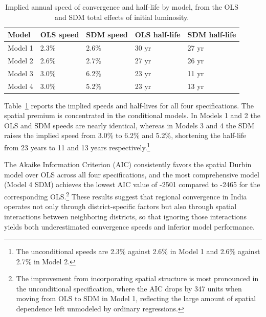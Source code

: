 \documentclass[
  a4paper, 
  twoside,
  final
]{article}
\begin{document}
\begin{longtable}[]{@{}lllll@{}}

\caption{\label{tbl-speed}Implied annual speed of convergence and
half-life by model, from the OLS and SDM total effects of initial
luminosity.}

\tabularnewline

\toprule\noalign{}
Model & OLS speed & SDM speed & OLS half-life & SDM half-life \\
\midrule\noalign{}
\endhead
\bottomrule\noalign{}
\endlastfoot
Model 1 & 2.3\% & 2.6\% & 30 yr & 27 yr \\
Model 2 & 2.6\% & 2.7\% & 27 yr & 26 yr \\
Model 3 & 3.0\% & 6.2\% & 23 yr & 11 yr \\
Model 4 & 3.0\% & 5.2\% & 23 yr & 13 yr \\

\end{longtable}

Table~\ref{tbl-speed} reports the implied speeds and half-lives for all
four specifications. The spatial premium is concentrated in the
conditional models. In Models 1 and 2 the OLS and SDM speeds are nearly
identical, whereas in Models 3 and 4 the SDM raises the implied speed
from 3.0\% to 6.2\% and 5.2\%, shortening the half-life from 23 years to
11 and 13 years respectively.\footnote{The unconditional speeds are
  2.3\% against 2.6\% in Model 1 and 2.6\% against 2.7\% in Model 2.}

The Akaike Information Criterion (AIC) consistently favors the spatial
Durbin model over OLS across all four specifications, and the most
comprehensive model (Model 4 SDM) achieves the lowest AIC value of -2501
compared to -2465 for the corresponding OLS.\footnote{The improvement
  from incorporating spatial structure is most pronounced in the
  unconditional specification, where the AIC drops by 347 units when
  moving from OLS to SDM in Model 1, reflecting the large amount of
  spatial dependence left unmodeled by ordinary regressions.} These
results suggest that regional convergence in India operates not only
through district-specific factors but also through spatial interactions
between neighboring districts, so that ignoring those interactions
yields both underestimated convergence speeds and inferior model
performance.
\end{document}
